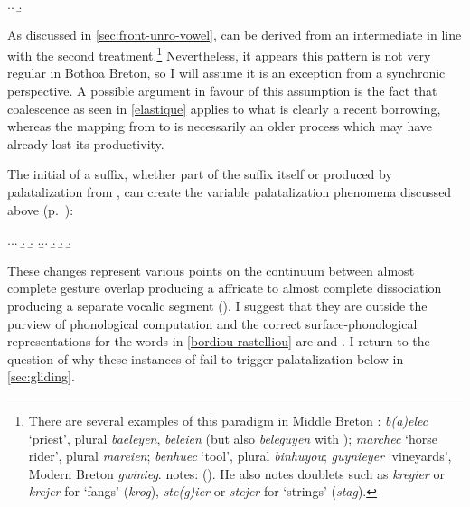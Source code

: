 \ex.\a.
\b.

As discussed in \cref{sec:front-unro-vowel}, \ipa{[ˈbɛːliən]} can be derived from an intermediate \ipa{[ˈbɛːləiən]} in line with the second treatment.\footnote{There are several examples of this paradigm in Middle Breton \citep{LlydawegCanol,schrijver11:_middl_early_moder_breton}: \emph{b(a)elec} `priest', plural \emph{baeleyen}, \emph{beleien} (but also \emph{beleguyen} with \ipa{[ɡj]}); \emph{marchec} `horse rider', plural \emph{mareien}; \emph{benhuec} `tool', plural \emph{binhuyou}; \emph{guynieyer} `vineyards', Modern Breton \emph{gwinieg}. \citet[§54]{favereau01} notes:  (). He also notes doublets such as \emph{kregier} or \emph{krejer} for `fangs' (\emph{krog}), \emph{ste(g)ier} or \emph{stejer} for `strings' (\emph{stag}).} Nevertheless, it appears this pattern is not very regular in Bothoa Breton, so I will assume it is an exception from a synchronic perspective. A possible argument in favour of this assumption is the fact that coalescence as seen in \cref{elastique} applies to what is clearly a recent borrowing, whereas the mapping from  to  \ipa{[j]} is necessarily an older process which may have already lost its productivity.

The initial \ipa{[i]} of a suffix, whether part of the suffix itself or produced by palatalization from \ipa{[l]}, can create the variable palatalization phenomena discussed above (p.~\pageref{bothoa-phonetic-palatalization}):

\ex.\label{bordiou-rastelliou}\a.\a.
\b.
\b.
\z.\b.\a.
\b.
\b.
\b.

These changes represent various points on the continuum between almost complete gesture overlap producing a affricate to almost complete dissociation producing a separate vocalic segment (\cf \citealp{zsiga95:_americ_englis,zsiga00:_phonet}). I suggest that they are outside the purview of phonological computation and the correct surface\hyp phonological representations for the words in \cref{bordiou-rastelliou} are \ipa{[ˈbɒrdiəw]} and \ipa{[ˈhrastiəw]}. I return to the question of why these instances of \ipa{[i]} fail to trigger palatalization below in \cref{sec:gliding}.

